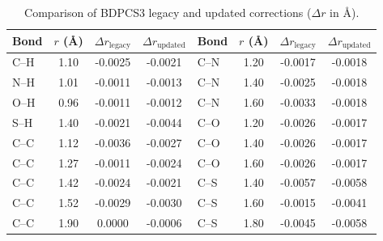 \documentclass[a4paper]{article}
\begin{document}
\begin{table}[h]
\centering
\caption{Comparison of BDPCS3 legacy and updated corrections ($\Delta r$ in \AA).}
\begin{tabular}{lccc|lccc}
\hline
Bond & $r$ (\AA) & $\Delta r_{\mathrm{legacy}}$ & $\Delta r_{\mathrm{updated}}$ &
Bond & $r$ (\AA) & $\Delta r_{\mathrm{legacy}}$ & $\Delta r_{\mathrm{updated}}$ \\
\hline
C--H & 1.10 & -0.0025 & -0.0021 & C--N & 1.20 & -0.0017 & -0.0018 \\
N--H & 1.01 & -0.0011 & -0.0013 & C--N & 1.40 & -0.0025 & -0.0018 \\
O--H & 0.96 & -0.0011 & -0.0012 & C--N & 1.60 & -0.0033 & -0.0018 \\
S--H & 1.40 & -0.0021 & -0.0044 & C--O & 1.20 & -0.0026 & -0.0017 \\
C--C & 1.12 & -0.0036 & -0.0027 & C--O & 1.40 & -0.0026 & -0.0017 \\
C--C & 1.27 & -0.0011 & -0.0024 & C--O & 1.60 & -0.0026 & -0.0017 \\
C--C & 1.42 & -0.0024 & -0.0021 & C--S & 1.40 & -0.0057 & -0.0058 \\
C--C & 1.52 & -0.0029 & -0.0030 & C--S & 1.60 & -0.0015 & -0.0041 \\
C--C & 1.90 &  0.0000 & -0.0006 & C--S & 1.80 & -0.0045 & -0.0058 \\
\hline
\end{tabular}
\end{table}

\end{document}
